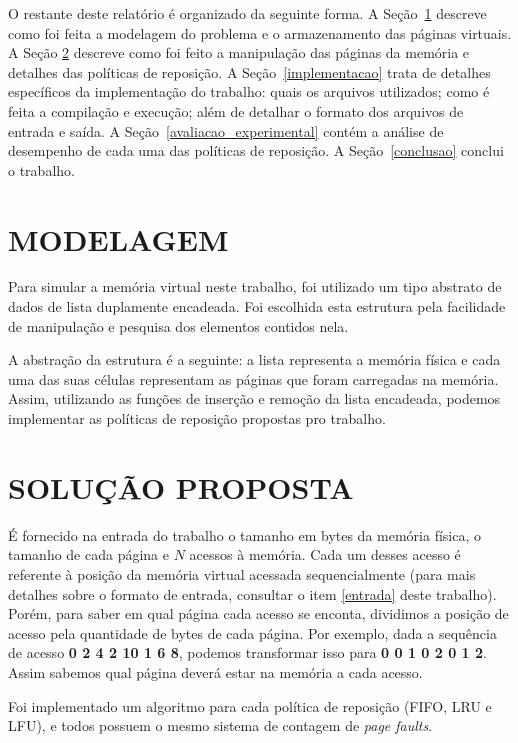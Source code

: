 \documentclass[12pt]{article}
\begin{document}
	O restante deste relatório é organizado da seguinte forma. A Seção~\ref{modelagem} descreve como foi feita a modelagem do problema e o armazenamento das páginas virtuais. A Seção \ref{solucao_proposta} descreve como foi feito a manipulação das páginas da memória e detalhes das políticas de reposição. A Seção~\ref{implementacao} trata de detalhes específicos da implementação do trabalho: quais os arquivos utilizados; como é feita a compilação e execução; além de detalhar o formato dos arquivos de entrada e saída. A Seção~\ref{avaliacao_experimental} contém a análise de desempenho de cada uma das políticas de reposição. A Seção~\ref{conclusao} conclui o trabalho.


\section{MODELAGEM}
\label{modelagem}

Para simular a memória virtual neste trabalho, foi utilizado um tipo abstrato de dados de lista duplamente encadeada. Foi escolhida esta estrutura pela facilidade de manipulação e pesquisa dos elementos contidos nela.

A abstração da estrutura é a seguinte: a lista representa a memória física e cada uma das suas células representam as páginas que foram carregadas na memória. Assim, utilizando as funções de inserção e remoção da lista encadeada, podemos implementar as políticas de reposição propostas pro trabalho.

\section{SOLUÇÃO PROPOSTA}
\label{solucao_proposta}

É fornecido na entrada do trabalho o tamanho em bytes da memória física, o tamanho de cada página e $N$ acessos à memória. Cada um desses acesso é referente à posição da memória virtual acessada sequencialmente (para mais detalhes sobre o formato de entrada, consultar o item \ref{entrada} deste trabalho). Porém, para saber em qual página cada acesso se enconta, dividimos a posição de acesso pela quantidade de bytes de cada página. Por exemplo, dada a sequência de acesso \textbf{0 2 4 2 10 1 6 8}, podemos transformar isso para \textbf{0 0 1 0 2 0 1 2}. Assim sabemos qual página deverá estar na memória a cada acesso.

Foi implementado um algoritmo para cada política de reposição (FIFO, LRU e LFU), e todos possuem o mesmo sistema de contagem de \textit{page faults}.
\end{document}
